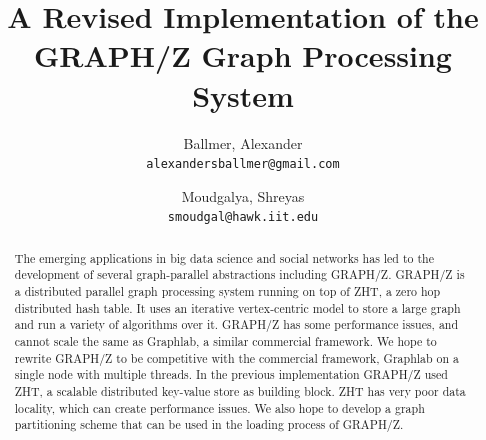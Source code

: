 \documentclass[10pt]{article}
\begin{document}
\nocite{Gz:5}
\nocite{Gz:6}
\nocite{Gz:7}
\nocite{Gz:8}
\nocite{Gz:9}
\nocite{Gz:10}
\nocite{Gz:11}
\nocite{Gz:12}
\title{A Revised Implementation of the GRAPH/Z Graph Processing System}

\author{
  Ballmer, Alexander\\
  \texttt{alexandersballmer@gmail.com}
  \and
  Moudgalya, Shreyas\\
  \texttt{smoudgal@hawk.iit.edu}
}

\maketitle

\begin{abstract}
  The emerging applications in big data science and social networks has led to the development of several graph-parallel abstractions including GRAPH/Z. GRAPH/Z is a distributed parallel graph processing system running on top of ZHT, a zero hop distributed hash table. It uses an iterative vertex-centric model to store a large graph and run a variety of algorithms over it. GRAPH/Z has some performance issues, and cannot scale the same as Graphlab, a similar commercial framework. We hope to rewrite GRAPH/Z to be competitive with the commercial framework, Graphlab on a single node with multiple threads.  In the previous implementation GRAPH/Z used ZHT, a scalable distributed key-value store as building block. ZHT has very poor data locality, which can create performance issues. We also hope to develop a graph partitioning scheme that can be used in the loading process of GRAPH/Z.
\end{abstract}
\end{document}
